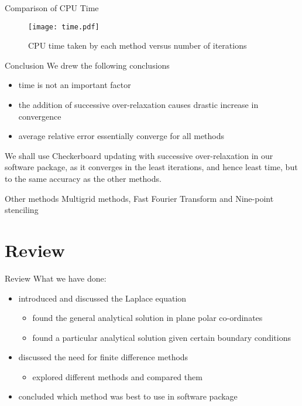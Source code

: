 \documentclass{beamer}
\begin{document}
\begin{frame}{Comparison of CPU Time}
\begin{figure}
\centering
\texttt{[image: time.pdf]}
\caption{CPU time taken by each method versus number of iterations}
\end{figure}

\end{frame}

\begin{frame}{Conclusion}
We drew the following conclusions
\begin{itemize}
\item time is not an important factor
\item the addition of successive over-relaxation causes drastic increase in convergence
\item average relative error essentially converge for all methods
\end{itemize}

We shall use Checkerboard updating with successive over-relaxation in our software
package, as it converges in the least iterations, and hence least time, but to the same
accuracy as the other methods.
\end{frame}

\begin{frame}{Other methods}
Multigrid methods, Fast Fourier Transform and Nine-point stenciling
\end{frame}

\section{Review}
\begin{frame}{Review}
What we have done:
\begin{itemize}
\item introduced and discussed the Laplace equation
\pause
 \begin{itemize}
 \item found the general analytical solution in plane polar co-ordinates
 \item found a particular analytical solution given certain boundary conditions
 \end{itemize}
\pause
\item discussed the need for finite difference methods
\pause
 \begin{itemize} 
 \item explored different methods and compared them
 \end{itemize}
\pause
\item concluded which method was best to use in software package
\end{itemize}
\end{frame}

\begin{frame}
\titlepage
\end{frame}
\end{document}
